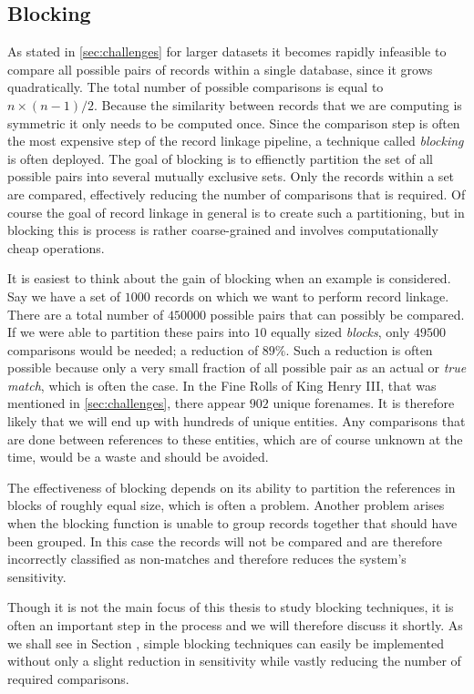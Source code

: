 \documentclass[paper=a4, fontsize=11pt]{scrartcl}
\begin{document}
\subsection{Blocking}
\label{sec:blocking}
As stated in \cref{sec:challenges} for larger datasets it becomes rapidly infeasible to compare all possible pairs of records within a single database, since it grows quadratically.
The total number of possible comparisons is equal to $n\times(n-1)/2$.
Because the similarity between records that we are computing is symmetric it only needs to be computed once.
Since the comparison step is often the most expensive step of the record linkage pipeline, a technique called \emph{blocking} is often deployed.
The goal of blocking is to effienctly partition the set of all possible pairs into several mutually exclusive sets.
Only the records within a set are compared, effectively reducing the number of comparisons that is required.
Of course the goal of record linkage in general is to create such a partitioning, but in blocking this is process is rather coarse-grained and involves computationally cheap operations.

It is easiest to think about the gain of blocking when an example is considered.
Say we have a set of $1000$ records on which we want to perform record linkage.
There are a total number of $450000$ possible pairs that can possibly be compared.
If we were able to partition these pairs into $10$ equally sized \emph{blocks}, only $49500$ comparisons would be needed; a reduction of $89\%$.
Such a reduction is often possible because only a very small fraction of all possible pair as an actual or \emph{true match}, which is often the case.
In the Fine Rolls of King Henry III, that was mentioned in \cref{sec:challenges}, there appear $902$ unique forenames.
It is therefore likely that we will end up with hundreds of unique entities.
Any comparisons that are done between references to these entities, which are of course unknown at the time, would be a waste and should be avoided.

The effectiveness of blocking depends on its ability to partition the references in blocks of roughly equal size, which is often a problem.
Another problem arises when the blocking function is unable to group records together that should have been grouped.
In this case the records will not be compared and are therefore incorrectly classified as non-matches and therefore reduces the system's sensitivity.

Though it is not the main focus of this thesis to study blocking techniques, it is often an important step in the process and we will therefore discuss it shortly.
As we shall see in Section , simple blocking techniques can easily be implemented without only a slight reduction in sensitivity while vastly reducing the number of required comparisons.
\end{document}
